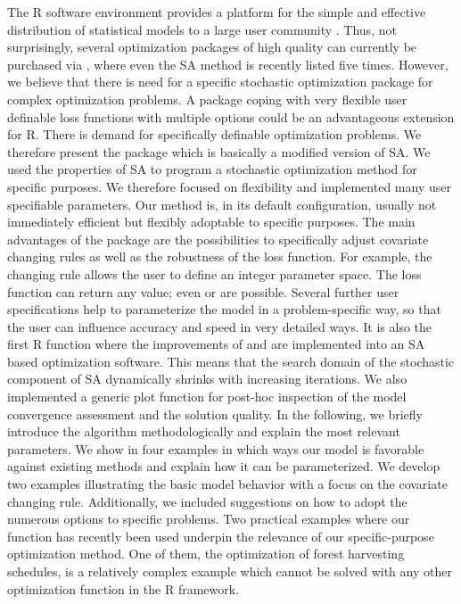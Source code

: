 The R software environment provides a platform for the simple and effective distribution of statistical models to a large user community \citep{xiang_2013}. Thus, not surprisingly, several optimization packages of high quality can currently be purchased via  \citep{theussl_2016}, where even the SA method is recently listed five times. However, we believe that there is need for a specific stochastic optimization package for complex optimization problems. A package coping with very flexible user definable loss functions with multiple options could be an advantageous extension for R. There is demand for specifically definable optimization problems. We therefore present the package  which is basically a modified version of SA. We used the properties of SA to program a stochastic optimization method for specific purposes. We therefore focused on flexibility and implemented many user specifiable parameters. Our method is, in its default configuration, usually not immediately efficient but flexibly adoptable to specific purposes. The main advantages of the package are the possibilities to specifically adjust covariate changing rules as well as the robustness of the loss function. For example, the changing rule allows the user to define an integer parameter space. The loss function can return any value; even  or  are possible. Several further user specifications help to parameterize the model in a problem-specific way, so that the user can influence accuracy and speed in very detailed ways. It is also the first R function where the improvements of \citet{corana_1987} and \citet{pronzato_1984} are implemented into an SA based optimization software. This means that the search domain of the stochastic component of SA dynamically shrinks with increasing iterations. We also implemented a generic plot function for post-hoc inspection of the model convergence assessment and the solution quality. 
In the following, we briefly introduce the algorithm methodologically and explain the most relevant parameters. We show in four examples in which ways our model is favorable against existing methods and explain how it can be parameterized. We develop two examples illustrating the basic model behavior with a focus on the covariate changing rule. Additionally, we included suggestions on how to adopt the numerous options to specific problems. Two practical examples where our function has recently been used underpin the relevance of our specific-purpose optimization method. One of them, the optimization of forest harvesting schedules, is a relatively complex example which cannot be solved with any other optimization function in the R framework.

